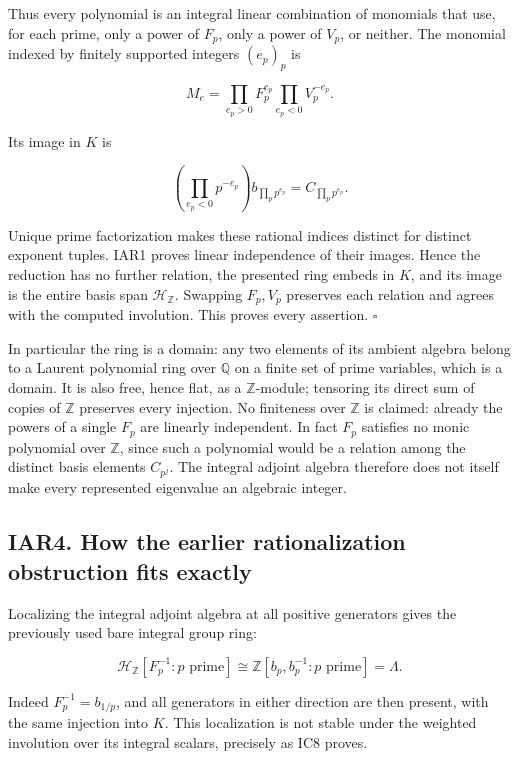 \documentclass[
]{article}
\begin{document}
Thus every polynomial is an integral linear combination of monomials
that use, for each prime, only a power of \(F_p\), only a power of
\(V_p\), or neither. The monomial indexed by finitely supported integers
\((e_p)_p\) is

\[
M_e=\prod_{e_p>0}F_p^{e_p}
\prod_{e_p<0}V_p^{-e_p}.
\]

Its image in \(K\) is

\[
\left(\prod_{e_p<0}p^{-e_p}\right)b_{\prod_p p^{e_p}}
=C_{\prod_p p^{e_p}}.
\tag{IAR3.5}
\]

Unique prime factorization makes these rational indices distinct for
distinct exponent tuples. IAR1 proves linear independence of their
images. Hence the reduction has no further relation, the presented ring
embeds in \(K\), and its image is the entire basis span
\(\mathcal H_{\mathbb Z}\). Swapping \(F_p,V_p\) preserves each relation
and agrees with the computed involution. This proves every assertion.
\(\square\)

In particular the ring is a domain: any two elements of its ambient
algebra belong to a Laurent polynomial ring over \(\mathbb Q\) on a
finite set of prime variables, which is a domain. It is also free, hence
flat, as a \(\mathbb Z\)-module; tensoring its direct sum of copies of
\(\mathbb Z\) preserves every injection. No finiteness over
\(\mathbb Z\) is claimed: already the powers of a single \(F_p\) are
linearly independent. In fact \(F_p\) satisfies no monic polynomial over
\(\mathbb Z\), since such a polynomial would be a relation among the
distinct basis elements \(C_{p^j}\). The integral adjoint algebra
therefore does not itself make every represented eigenvalue an algebraic
integer.

\subsection{IAR4. How the earlier rationalization obstruction fits
exactly}\label{iar4.-how-the-earlier-rationalization-obstruction-fits-exactly}

Localizing the integral adjoint algebra at all positive generators gives
the previously used bare integral group ring:

\[
\mathcal H_{\mathbb Z}[F_p^{-1}:p\text{ prime}]
\cong\mathbb Z[b_p,b_p^{-1}:p\text{ prime}]=\Lambda.
\tag{IAR4.1}
\]

Indeed \(F_p^{-1}=b_{1/p}\), and all generators in either direction are
then present, with the same injection into \(K\). This localization is
not stable under the weighted involution over its integral scalars,
precisely as IC8 proves.
\end{document}
